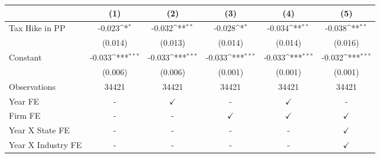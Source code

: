 {
\def\sym#1{\ifmmode^{#1}\else\(^{#1}\)\fi}
\begin{tabular}{l*{5}{c}}
\toprule
                    &\multicolumn{1}{c}{(1)}         &\multicolumn{1}{c}{(2)}         &\multicolumn{1}{c}{(3)}         &\multicolumn{1}{c}{(4)}         &\multicolumn{1}{c}{(5)}         \\
\midrule
Tax Hike in PP      &      -0.023\sym{*}  &      -0.032\sym{**} &      -0.028\sym{*}  &      -0.034\sym{**} &      -0.038\sym{**} \\
                    &     (0.014)         &     (0.013)         &     (0.014)         &     (0.014)         &     (0.016)         \\
Constant            &      -0.033\sym{***}&      -0.033\sym{***}&      -0.033\sym{***}&      -0.033\sym{***}&      -0.032\sym{***}\\
                    &     (0.006)         &     (0.006)         &     (0.001)         &     (0.001)         &     (0.001)         \\
\midrule
Observations        &       34421         &       34421         &       34421         &       34421         &       34421         \\
Year FE             &           -         &$\checkmark$         &           -         &$\checkmark$         &           -         \\
Firm FE             &           -         &           -         &$\checkmark$         &$\checkmark$         &$\checkmark$         \\
Year X State FE     &           -         &           -         &           -         &           -         &$\checkmark$         \\
Year X Industry FE  &           -         &           -         &           -         &           -         &$\checkmark$         \\
\bottomrule
\end{tabular}
}
